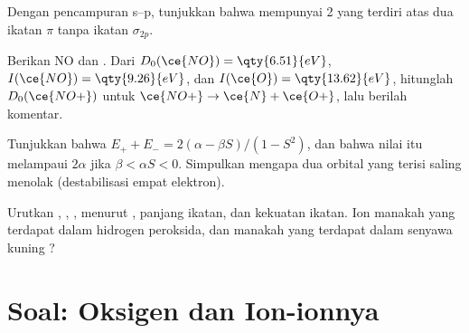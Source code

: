 \begin{exercise}[$\star\star$]\label{exo:b2:diatomic-mos:9}
Dengan pencampuran s--p, tunjukkan bahwa  mempunyai  2
yang terdiri atas dua ikatan $\pi$ tanpa ikatan $\sigma_{2p}$.
\end{exercise}

\begin{exercise}[$\star\star\star$]\label{exo:b2:diatomic-mos:10}
Berikan  NO dan . Dari $D_0(\ce{NO}) = \qty{6.51}{eV}$,
$I(\ce{NO}) =
\qty{9.26}{eV}$, dan $I(\ce{O}) = \qty{13.62}{eV}$, hitunglah
$D_0(\ce{NO+})$ untuk $\ce{NO+} \to
\ce{N} + \ce{O+}$, lalu berilah
komentar.
\end{exercise}

\begin{exercise}[$\star\star\star$]\label{exo:b2:diatomic-mos:11}
Tunjukkan bahwa $E_+ + E_- = 2(\alpha - \beta S)/(1 - S^2)$, dan bahwa nilai
itu melampaui $2\alpha$ jika $\beta < \alpha S < 0$. Simpulkan mengapa dua
orbital yang terisi saling menolak (destabilisasi empat elektron).
\end{exercise}

\begin{exercise}[$\star\star\star$]\label{exo:b2:diatomic-mos:12}
Urutkan , , ,  menurut , panjang
ikatan, dan kekuatan ikatan. Ion manakah yang terdapat dalam hidrogen
peroksida, dan manakah yang terdapat dalam senyawa kuning ?
\end{exercise}

\section{Soal: Oksigen dan Ion-ionnya}

